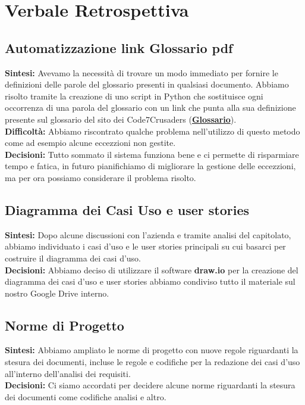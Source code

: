 \documentclass{article}
\begin{document}
\section{Verbale Retrospettiva}

    \subsection{Automatizzazione link Glossario pdf}
    \textbf{Sintesi:} Avevamo la necessità di trovare un modo immediato per fornire le definizioni delle parole del glossario presenti in qualsiasi documento. Abbiamo risolto tramite la creazione di uno script in Python che sostituisce ogni occorrenza di una parola del glossario con un link che punta alla sua definizione presente sul glossario del sito dei Code7Crusaders (\href{https://code7crusaders.github.io/docs/RTB/documentazione_interna/glossario.html}{\textbf{Glossario}}). \\
    \textbf{Difficoltà:} Abbiamo riscontrato qualche problema nell'utilizzo di questo metodo come ad esempio alcune eccezzioni non gestite. \\
    \textbf{Decisioni:} Tutto sommato il sistema funziona bene e ci permette di risparmiare tempo e fatica, in futuro pianifichiamo di migliorare la gestione delle eccezzioni, ma per ora possiamo considerare il problema risolto. 

    \subsection{Diagramma dei Casi Uso e user stories}
    \textbf{Sintesi:} Dopo alcune discussioni con l'azienda e tramite analisi del capitolato, abbiamo individuato i casi d'uso e le user stories principali su cui basarci per costruire il diagramma dei casi d'uso. \\
    \textbf{Decisioni:} Abbiamo deciso di utilizzare il software \textbf{draw.io} per la creazione del diagramma dei casi d'uso e user stories abbiamo condiviso tutto il materiale sul nostro Google Drive interno.

    \subsection{Norme di Progetto}
    \textbf{Sintesi:} Abbiamo ampliato le norme di progetto con nuove regole riguardanti la stesura dei documenti, incluse le regole e codifiche per la redazione dei casi d'uso all'interno dell'analisi dei requisiti. \\
    \textbf{Decisioni:} Ci siamo accordati per decidere alcune norme riguardanti la stesura dei documenti come codifiche analisi e altro.
    
\end{document}
